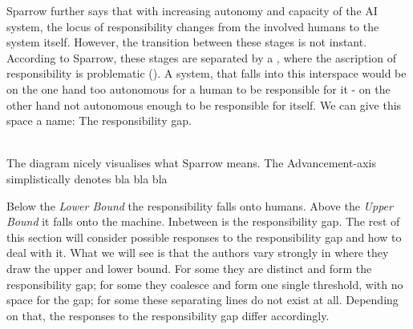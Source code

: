 \documentclass{article}
\begin{document}
Sparrow further says that with increasing autonomy and capacity
of the AI system, the locus of responsibility changes from the involved humans
to the system itself. However, the transition between these stages is not
instant. According to Sparrow, these stages are separated by a , where the ascription of responsibility is problematic
(\cite[p.74]{sparrow2007killer}). A system, that
falls into this interspace would be on the one hand too autonomous for a human to
be responsible for it - on the other hand not autonomous enough to be responsible
for itself. We can give this space a name: The responsibility gap.\\

\\



The diagram nicely visualises what Sparrow means. The Advancement-axis
simplistically denotes bla bla bla

Below the \textit{Lower Bound}
the responsibility falls onto humans. Above the \textit{Upper Bound} it falls
onto the machine. Inbetween is the responsibility gap. The rest of this section
will consider possible responses to the responsibility gap and how to deal with
it. What we will see is that the authors vary strongly in where they draw the
upper and lower bound. For some they are distinct and form the responsibility
gap; for some they coalesce and form one single threshold, with no space for the
gap; for some these separating lines do not exist at all. Depending on that, the
responses to the responsibility gap differ accordingly.
\end{document}
